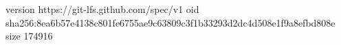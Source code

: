 version https://git-lfs.github.com/spec/v1
oid sha256:8ea6b57e4138c801fe6755ae9c63809c3f1b33293d2dc4d508e1f9a8efbd808e
size 174916
